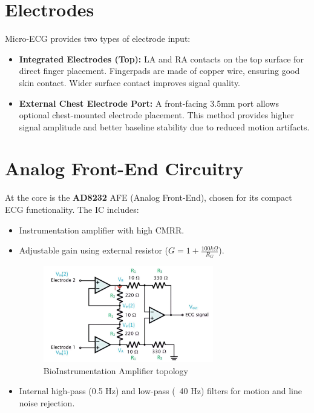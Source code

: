 \section{Electrodes}
Micro-ECG provides two types of electrode input:
\begin{itemize}
    \item \textbf{Integrated Electrodes (Top):} LA and RA contacts on the top surface for direct finger placement. Fingerpads are made of copper wire, ensuring good skin contact. Wider surface contact improves signal quality.
    \item \textbf{External Chest Electrode Port:} A front-facing 3.5mm port allows optional chest-mounted electrode placement. This method provides higher signal amplitude and better baseline stability due to reduced motion artifacts.
\end{itemize}

\section{Analog Front-End Circuitry}
At the core is the \textbf{AD8232} AFE (Analog Front-End), chosen for its compact ECG functionality. The IC includes:
\begin{itemize}
    \item Instrumentation amplifier with high CMRR.
    \item Adjustable gain using external resistor ($G = 1 + \frac{100k\Omega}{R_G}$).
    \begin{figure}[H]
    \centering
        \includegraphics[width=0.7\textwidth]{images/bio_Ins.jpg}
        \caption{BioInstrumentation Amplifier topology}
        \label{fig:bioIns_block}
    \end{figure}
    \item Internal high-pass (0.5 Hz) and low-pass (~40 Hz) filters for motion and line noise rejection.
\end{itemize}

